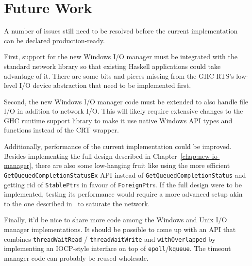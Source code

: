 \documentclass[a4paper,11pt,oneside]{report}
\begin{document}
\section{Future Work}

A number of issues still need to be resolved before the current implementation
can be declared production-ready.

First, support for the new Windows I/O manager must be integrated with the
standard network library so that existing Haskell applications could take
advantage of it. There are some bits and pieces missing from the GHC RTS's
low-level I/O device abstraction that need to be implemented first.

Second, the new Windows I/O manager code must be extended to also handle file
I/O in addition to network I/O. This will likely require extensive changes to
the GHC runtime support library to make it use native Windows API types and
functions instead of the CRT wrapper.

Additionally, performance of the current implementation could be
improved. Besides implementing the full design described in
Chapter~\ref{chap:new-io-manager}, there are also some low-hanging fruit like
using the more efficient \texttt{GetQueuedCompletionStatusEx} API instead of
\texttt{GetQueuedCompletionStatus} and getting rid of \texttt{StablePtr}s in
favour of \texttt{ForeignPtr}s. If the full design were to be implemented,
testing its performance would require a more advanced setup akin to the one
described in~\cite{bib:voellmy} to saturate the network.

Finally, it'd be nice to share more code among the Windows and Unix I/O manager
implementations.  It should be possible to come up with an API that combines
\texttt{threadWaitRead} / \texttt{threadWaitWrite} and \texttt{withOverlapped}
by implementing an IOCP-style interface on top of
\texttt{epoll}/\texttt{kqueue}. The timeout manager code can probably be reused
wholesale.
\end{document}
